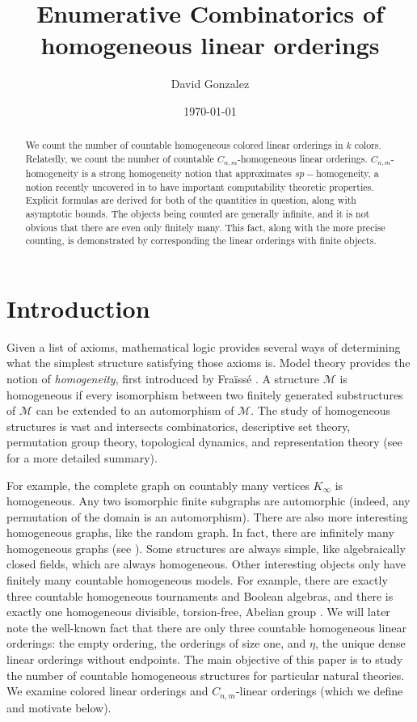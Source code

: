 \documentclass[11pt]{amsart}
\title{Enumerative Combinatorics of homogeneous linear orderings}
\author[Gonzalez]{David Gonzalez}
\date{\today}
\theoremstyle{definition}
\def\M{{\mathcal M}}
\begin{document}
\maketitle
\begin{abstract} 
    We count the number of countable homogeneous colored linear orderings in $k$ colors.
    Relatedly, we count the number of countable $C_{n,m}$-homogeneous linear orderings.
    $C_{n,m}$-homogeneity is a strong homogeneity notion that approximates $sp-$homogeneity, a notion recently uncovered in \cite{CCGHN} to have important computability theoretic properties.
    Explicit formulas are derived for both of the quantities in question, along with asymptotic bounds.
    The objects being counted are generally infinite, and it is not obvious that there are even only finitely many.
    This fact, along with the more precise counting, is demonstrated by corresponding the linear orderings with finite objects.
\end{abstract}

\section{Introduction}


Given a list of axioms, mathematical logic provides several ways of determining what the simplest structure satisfying those axioms is.
Model theory provides the notion of \textit{homogeneity}, first introduced by Fraïssé \cite{Fr86}.
A structure $\M$ is homogeneous if every isomorphism between two finitely generated substructures of $\M$ can be extended to an automorphism of $\M$.
The study of homogeneous structures is vast and intersects combinatorics, descriptive set theory, permutation group theory, topological dynamics, and representation theory (see \cite{Mac11} for a more detailed summary).

For example, the complete graph on countably many vertices $K_\infty$ is homogeneous.
Any two isomorphic finite subgraphs are automorphic (indeed, any permutation of the domain is an automorphism).
There are also more interesting homogeneous graphs, like the random graph.
In fact, there are infinitely many homogeneous graphs (see \cite{Hen71}).
Some structures are always simple, like algebraically closed fields, which are always homogeneous.
Other interesting objects only have finitely many countable homogeneous models.
For example, there are exactly three countable homogeneous tournaments and Boolean algebras, and there is exactly one homogeneous divisible, torsion-free, Abelian group \cite{Lac84}.
We will later note the well-known fact that there are only three countable homogeneous linear orderings: the empty ordering, the orderings of size one, and $\eta$, the unique dense linear orderings without endpoints.
The main objective of this paper is to study the number of countable homogeneous structures for particular natural theories.
We examine colored linear orderings and $C_{n,m}$-linear orderings (which we define and motivate below).
\end{document}
